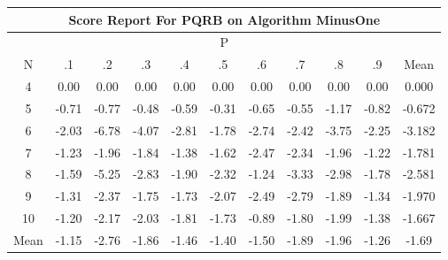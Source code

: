 \documentclass[11pt,a4paper]{report}
\begin{document}
\begin{longtable}{ | c || c | c | c | c | c | c | c | c | c || c |}
\hline
\multicolumn{11}{|c|}{ Score Report For PQRB on Algorithm MinusOne} \\
\hline
\multicolumn{11}{|c|}{ P } \\
\hline
N & .1 & .2 & .3 & .4 & .5 & .6 & .7 & .8 & .9 & Mean\\
 \hline
 \hline
 \endhead
  4 &  \cellcolor[HTML]{FFFFFF} 0.00 &  \cellcolor[HTML]{FFFFFF} 0.00 &  \cellcolor[HTML]{FFFFFF} 0.00 &  \cellcolor[HTML]{FFFFFF} 0.00 &  \cellcolor[HTML]{FFFFFF} 0.00 &  \cellcolor[HTML]{FFFFFF} 0.00 &  \cellcolor[HTML]{FFFFFF} 0.00 &  \cellcolor[HTML]{FFFFFF} 0.00 &  \cellcolor[HTML]{FFFFFF} 0.00 & 0.000 \\
  5 &  \cellcolor[HTML]{FFEFEF} -0.71 &  \cellcolor[HTML]{FFEFEF} -0.77 &  \cellcolor[HTML]{FFEFEF} -0.48 &  \cellcolor[HTML]{FFEFEF} -0.59 &  \cellcolor[HTML]{FFF7F7} -0.31 &  \cellcolor[HTML]{FFEFEF} -0.65 &  \cellcolor[HTML]{FFEFEF} -0.55 &  \cellcolor[HTML]{FFDFDF} -1.17 &  \cellcolor[HTML]{FFE7E7} -0.82 & -0.672 \\
  6 &  \cellcolor[HTML]{FFCFCF} -2.03 &  \cellcolor[HTML]{FF5858} -6.78 &  \cellcolor[HTML]{FF9797} -4.07 &  \cellcolor[HTML]{FFB7B7} -2.81 &  \cellcolor[HTML]{FFCFCF} -1.78 &  \cellcolor[HTML]{FFB7B7} -2.74 &  \cellcolor[HTML]{FFBFBF} -2.42 &  \cellcolor[HTML]{FF9F9F} -3.75 &  \cellcolor[HTML]{FFC7C7} -2.25 & -3.182 \\
  7 &  \cellcolor[HTML]{FFDFDF} -1.23 &  \cellcolor[HTML]{FFCFCF} -1.96 &  \cellcolor[HTML]{FFCFCF} -1.84 &  \cellcolor[HTML]{FFDFDF} -1.38 &  \cellcolor[HTML]{FFD7D7} -1.62 &  \cellcolor[HTML]{FFBFBF} -2.47 &  \cellcolor[HTML]{FFC7C7} -2.34 &  \cellcolor[HTML]{FFCFCF} -1.96 &  \cellcolor[HTML]{FFDFDF} -1.22 & -1.781 \\
  8 &  \cellcolor[HTML]{FFD7D7} -1.59 &  \cellcolor[HTML]{FF7878} -5.25 &  \cellcolor[HTML]{FFB7B7} -2.83 &  \cellcolor[HTML]{FFCFCF} -1.90 &  \cellcolor[HTML]{FFC7C7} -2.32 &  \cellcolor[HTML]{FFDFDF} -1.24 &  \cellcolor[HTML]{FFAFAF} -3.33 &  \cellcolor[HTML]{FFB7B7} -2.98 &  \cellcolor[HTML]{FFCFCF} -1.78 & -2.581 \\
  9 &  \cellcolor[HTML]{FFDFDF} -1.31 &  \cellcolor[HTML]{FFC7C7} -2.37 &  \cellcolor[HTML]{FFCFCF} -1.75 &  \cellcolor[HTML]{FFD7D7} -1.73 &  \cellcolor[HTML]{FFC7C7} -2.07 &  \cellcolor[HTML]{FFBFBF} -2.49 &  \cellcolor[HTML]{FFB7B7} -2.79 &  \cellcolor[HTML]{FFCFCF} -1.89 &  \cellcolor[HTML]{FFDFDF} -1.34 & -1.970 \\
  10 &  \cellcolor[HTML]{FFDFDF} -1.20 &  \cellcolor[HTML]{FFC7C7} -2.17 &  \cellcolor[HTML]{FFCFCF} -2.03 &  \cellcolor[HTML]{FFCFCF} -1.81 &  \cellcolor[HTML]{FFD7D7} -1.73 &  \cellcolor[HTML]{FFE7E7} -0.89 &  \cellcolor[HTML]{FFCFCF} -1.80 &  \cellcolor[HTML]{FFCFCF} -1.99 &  \cellcolor[HTML]{FFDFDF} -1.38 & -1.667 \\
 \hline
 \hline
Mean &  \cellcolor[HTML]{FFDFDF} -1.15 &  \cellcolor[HTML]{FFB7B7} -2.76 &  \cellcolor[HTML]{FFCFCF} -1.86 &  \cellcolor[HTML]{FFD7D7} -1.46 &  \cellcolor[HTML]{FFDFDF} -1.40 &  \cellcolor[HTML]{FFD7D7} -1.50 &  \cellcolor[HTML]{FFCFCF} -1.89 &  \cellcolor[HTML]{FFCFCF} -1.96 &  \cellcolor[HTML]{FFDFDF} -1.26 &  \cellcolor[HTML]{FFD7D7} -1.69
\end{longtable}
\end{document}
